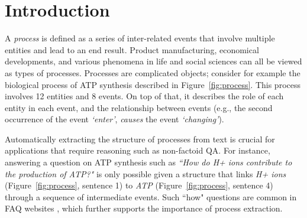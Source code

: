 \section{Introduction}

A \emph{process} is defined as a series of inter-related events that involve multiple entities and lead to an end result. Product manufacturing, economical developments, and various phenomena in life and social sciences can all be viewed as types of processes. Processes are complicated objects; consider for example the biological process of ATP synthesis described in Figure~\ref{fig:process}. This process involves 12 entities and 8 events. On top of that, it describes the role of each entity in each event, and the relationship between events (e.g., the second occurrence of the event \textit{`enter'}, \textit{causes} the event \textit{`changing'}). 


Automatically extracting the structure of processes from text is crucial for applications that require reasoning such as non-factoid QA. For instance, answering a question on ATP synthesis such as \emph{``How do H+ ions contribute to the production of ATP?"} is only possible given a structure that links \emph{H+ ions} (Figure~\ref{fig:process}, sentence 1) to \emph{ATP} (Figure~\ref{fig:process}, sentence 4) through a sequence of intermediate events. Such ``how" questions are common in FAQ websites \cite{Surdeanu:2011}, which further supports the importance of process extraction.



